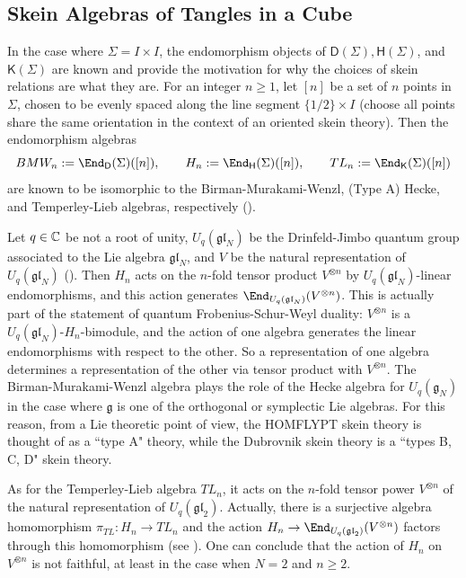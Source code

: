 
\subsection{Skein Algebras of Tangles in a Cube}

In the case where $\Sigma = I \times I$, the endomorphism objects of $\mathsf{D}(\Sigma), \mathsf{H}(\Sigma)$, and $\mathsf{K}(\Sigma)$ are known and provide the motivation for why the choices of skein relations are what they are. For an integer $n \geq 1$, let $[n]$ be a set of $n$ points in $\Sigma$, chosen to be evenly spaced along the line segment $\{ 1/2 \} \times I$ (choose all points share the same orientation in the context of an oriented skein theory). Then the endomorphism algebras 
\[
BMW_n := \End_\mathsf{D}(\Sigma)([n]), \qquad H_n := \End_\mathsf{H}(\Sigma)([n]), \qquad TL_n := \End_\mathsf{K}(\Sigma)([n])
\]
are known to be isomorphic to the Birman-Murakami-Wenzl, (Type A) Hecke, and Temperley-Lieb algebras, respectively (). 

Let $q \in \mathbb{C}$ be not a root of unity, $U_q(\mathfrak{gl}_N)$ be the Drinfeld-Jimbo quantum group associated to the Lie algebra $\mathfrak{gl}_N$, and $V$ be the natural representation of $U_q(\mathfrak{gl}_N)$ (). Then $H_n$ acts on the $n$-fold tensor product $V^{\otimes n}$ by $U_q(\mathfrak{gl}_N)$-linear endomorphisms, and this action generates $\End_{U_q(\mathfrak{gl}_N)}(V^{\otimes n})$. This is actually part of the statement of quantum Frobenius-Schur-Weyl duality: $V^{\otimes n}$ is a $U_q(\mathfrak{gl}_N)$-$H_n$-bimodule, and the action of one algebra generates the linear endomorphisms with respect to the other. So a representation of one algebra determines a representation of the other via tensor product with $V^{\otimes n}$. The Birman-Murakami-Wenzl algebra plays the role of the Hecke algebra for $U_q(\mathfrak{g}_N)$ in the case where $\mathfrak{g}$ is one of the orthogonal or symplectic Lie algebras. For this reason, from a Lie theoretic point of view, the HOMFLYPT skein theory is thought of as a ``type A" theory, while the Dubrovnik skein theory is a ``types B, C, D" skein theory.

As for the Temperley-Lieb algebra $TL_n$, it acts on the $n$-fold tensor power $V^{\otimes n}$ of the natural representation of $U_q(\mathfrak{gl}_2)$. Actually, there is a surjective algebra homomorphism $\pi_{TL}: H_n \to TL_n$ and the action $H_n \to \End_{U_q(\mathfrak{gl}_2)}(V^{\otimes n})$ factors through this homomorphism (see ). One can conclude that the action of $H_n$ on $V^{\otimes n}$ is not faithful, at least in the case when $N=2$ and $n \geq 2$. 

